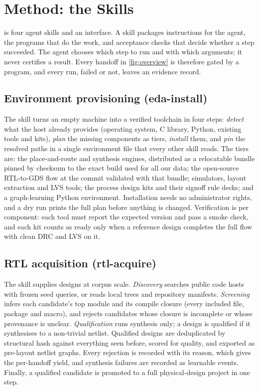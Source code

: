\section{Method: the \R Skills}
\label{sec:system}

\R is four agent skills and an interface. A skill packages instructions for the agent, the programs
that do the work, and acceptance checks that decide whether a step succeeded. The agent chooses which
step to run and with which arguments; it never certifies a result. Every handoff in
\cref{fig:overview} is therefore gated by a program, and every run, failed or not, leaves an evidence
record.

\subsection{Environment provisioning (eda-install)}
\label{sec:skill-install}
The skill turns an empty machine into a verified toolchain in four steps: \emph{detect} what the host
already provides (operating system, C library, Python, existing tools and kits), \emph{plan} the
missing components as tiers, \emph{install} them, and \emph{pin} the resolved paths in a single
environment file that every other skill reads. The tiers are: the place-and-route and synthesis
engines, distributed as a relocatable bundle pinned by checksum to the exact build used for all our
data; the open-source RTL-to-GDS flow at the commit validated with that bundle; simulators, layout
extraction and LVS tools; the process design kits and their signoff rule decks; and a graph-learning
Python environment. Installation needs no administrator rights, and a dry run prints the full plan
before anything is changed. Verification is per component: each tool must report the expected
version and pass a smoke check, and each kit counts as ready only when a reference design completes
the full flow with clean DRC and LVS on it.

\subsection{RTL acquisition (rtl-acquire)}
\label{sec:skill-rtl}
The skill supplies designs at corpus scale. \emph{Discovery} searches public code hosts with frozen
seed queries, or reads local trees and repository manifests. \emph{Screening} infers each candidate's
top module and its compile closure (every included file, package and macro), and rejects candidates
whose closure is incomplete or whose provenance is unclear. \emph{Qualification} runs synthesis only;
a design is qualified if it synthesises to a non-trivial netlist. Qualified designs are deduplicated
by structural hash against everything seen before, scored for quality, and exported as pre-layout
netlist graphs. Every rejection is recorded with its reason, which gives the per-handoff yield, and
synthesis failures are recorded as learnable events. Finally, a qualified candidate is promoted to a
full physical-design project in one step.

